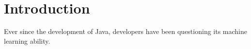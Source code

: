 \chapter{Introduction}
\label{chap:introduction}

Ever since the development of Java, developers have been questioning
its machine learning ability.
